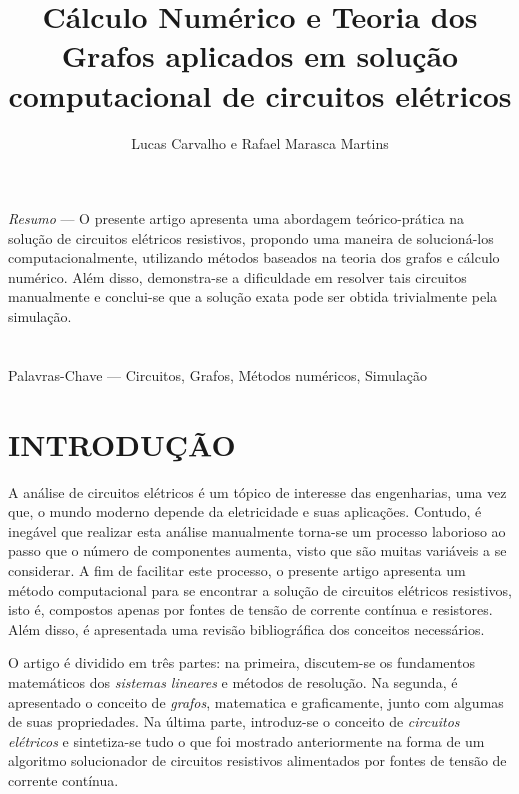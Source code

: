 \documentclass[twocolumn, 10pt,a4paper]{extarticle}
\begin{document}
\singlespacing

\title{Cálculo Numérico e Teoria dos Grafos aplicados em solução computacional de circuitos elétricos}
\date{}
\author{Lucas Carvalho e Rafael Marasca Martins}

\maketitle

\thispagestyle{empty}

\begin{bfseries}
\small
\textit{Resumo} — O presente artigo apresenta uma abordagem teórico-prática na solução de circuitos elétricos resistivos, propondo uma maneira de solucioná-los computacionalmente, utilizando métodos baseados na teoria dos grafos  e cálculo numérico. Além disso, demonstra-se a dificuldade em resolver tais circuitos manualmente e conclui-se que a solução exata pode ser obtida trivialmente pela simulação.
\\~\\~\\
Palavras-Chave — Circuitos, Grafos, Métodos numéricos, Simulação
\end{bfseries}

\section{INTRODUÇÃO}
A análise de circuitos elétricos é um tópico de interesse das engenharias, uma vez que, o mundo moderno depende da eletricidade e suas aplicações. Contudo, é inegável que realizar esta análise manualmente torna-se um processo laborioso ao passo que o número de componentes aumenta, visto que são muitas variáveis a se considerar. A fim de facilitar este processo, o presente artigo apresenta um método computacional para se encontrar a solução de circuitos elétricos resistivos, isto é, compostos apenas por fontes de tensão de corrente contínua e resistores. Além disso, é apresentada uma revisão bibliográfica dos conceitos necessários.

O artigo é dividido em três partes: na primeira, discutem-se os fundamentos matemáticos dos \textit{sistemas lineares} e métodos de resolução. Na segunda, é apresentado o conceito de \textit{grafos}, matematica e graficamente, junto com algumas de suas propriedades. Na última parte, introduz-se o conceito de \textit{circuitos elétricos} e sintetiza-se tudo o que foi mostrado anteriormente na forma de um algoritmo solucionador de circuitos resistivos alimentados por fontes de tensão de corrente contínua.
\end{document}

